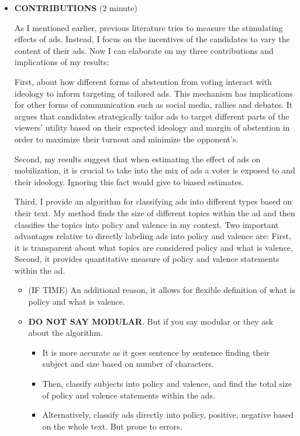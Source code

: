 \documentclass[12pt]{article}
\theoremstyle{plain}
\theoremstyle{plain}
\theoremstyle{plain}
\theoremstyle{plain}
\theoremstyle{plain}
\theoremstyle{plain}
\begin{document}
\begin{itemize}
\item \textbf{CONTRIBUTIONS} (2 minute)

As I mentioned earlier, previous literature tries to measure the stimulating effects of ads.
Instead, I focus on the incentives of the candidates to vary the content of their ads.
Now I can elaborate on my three contributions and implications of my results:

First, about how different forms of abstention from voting interact with ideology to inform targeting of tailored ads.
This mechanism has implications for other forms of communication such as social media, rallies and debates.
It argues that candidates strategically tailor ads to target different parts of the viewers' utility
based on their expected ideology and margin of abstention in order to maximize their turnout and minimize the opponent's.

Second, my results suggest that when estimating the effect of ads on mobilization, it is crucial to take into the mix of ads a voter is exposed to and their ideology.
Ignoring this fact would give to biased estimates.

Third, I provide an algorithm for classifying ads into different types based on their text.
My method finds the size of different topics within the ad and then classifies the topics into policy and valence in my context.
Two important advantages relative to directly labeling ads into policy and valence are:
First, it is transparent about what topics are considered policy and what is valence,
Second, it provides  quantitative measure of policy and valence statements within the ad.

\begin{itemize}
\item (IF TIME) An additional reason, it allows for flexible definition of what is policy and what is valence.
\item \textbf{DO NOT SAY MODULAR}. But if you say modular or they ask about the algorithm.
\begin{itemize}
\item It is more accurate as it goes sentence by sentence finding their subject and size based on number of characters.
\item Then, classify subjects into policy and valence, and find the total size of policy and valence statements within the ads.
\item Alternatively, classify ads directly into policy, positive, negative based on the whole text. But prone to errors.
\end{itemize}
\end{itemize}
\end{itemize}
\end{document}
